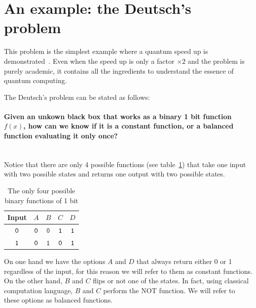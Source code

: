 \section{An example: the Deutsch's problem}
This problem is the simplest example where a quantum speed up is demonstrated~\cite{Deutsch1992}. Even when the speed up is only a factor $\times2$ and the problem is purely academic, it contains all the ingredients to understand the essence of quantum computing.

The Deutsch's problem can be stated as follows:

\paragraph{Given an unkown black box that works as a binary 1 bit function $f(x)$, how can we know if it is a constant function, or a balanced function evaluating it only once?\\}
\textcolor{white}{.}\\
Notice that there are only 4 possible functions (see table~\ref{binfunc}) that take one input with two possible states and returns one output with two possible states.
\begin{table}[h!]
\begin{center}
\begin{tabular}{c|c|c|c|c}
\multicolumn{1}{l|}{Input} & \multicolumn{1}{l|}{$A$} & \multicolumn{1}{l|}{$B$} & \multicolumn{1}{l|}{$C$} & \multicolumn{1}{l}{$D$} \\ \hline
$\texttt{0}$ & $\texttt{0}$ & $\texttt{0}$ & $\texttt{1}$ & $\texttt{1}$ \\ %
$\texttt{1}$ & $\texttt{0}$ & $\texttt{1}$ & $\texttt{0}$ & $\texttt{1}$ \\ %
\end{tabular}
\end{center}
\vspace{-15pt}\caption{The only four possible binary functions of 1 bit}
\label{binfunc}
\end{table}

On one hand we have the options $A$ and $D$ that always return either 0 or 1 regardless of the input, for this reason we will refer to them as constant functions.
On the other hand, $B$ and $C$ flips or not one of the states. In fact, using classical computation language, $B$ and $C$ perform the NOT function. We will refer to these options as balanced functions.\\

